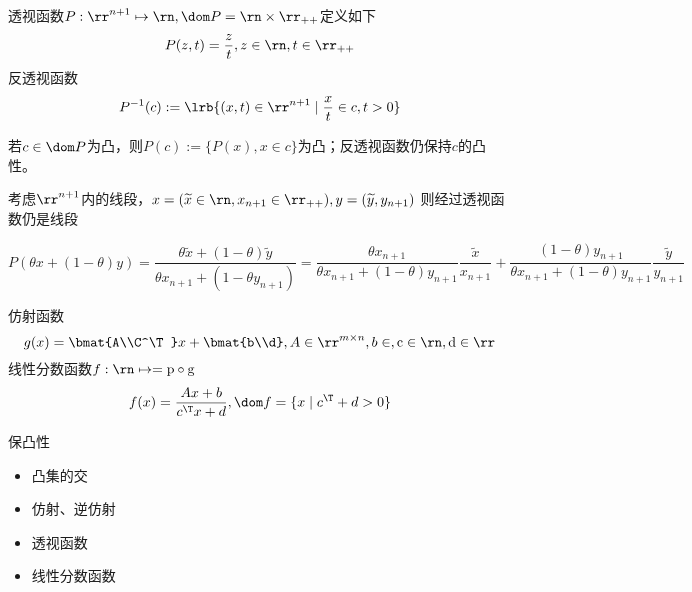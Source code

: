 \begin{definition}
透视函数$P:\rr^{n+1}\mapsto\rn,\dom P=\rn\times\rr_{++}$定义如下
\[P(z,t)=\dfrac{z}{t},z\in\rn,t\in\rr_{++}\]
反透视函数
\[P^{-1}(c):=\lrb{(x,t)\in\rr^{n+1}\mid\frac{x}{t}\in c,t>0}\]
\end{definition}

若$c\in\dom P$为凸，则$P(c):=\{P(x),x\in c\}$为凸；反透视函数仍保持$c$的凸性。

考虑$\rr^{n+1}$内的线段，$x=(\widetilde{x}\in\rn,x_{n+1}\in\rr_{++}),y=(\widetilde{y},y_{n+1})$
则经过透视函数仍是线段
\begin{analysis}
\[P(\theta x+(1-\theta)y)=\frac{\theta\widetilde{x}+(1-\theta)\widetilde{y}}{\theta x_{n+1}+(1-\theta y_{n+1})}=\frac{\theta x_{n+1}}{\theta x_{n+1}+(1-\theta)y_{n+1}}\frac{\widetilde{x}}{x_{n+1}}+\frac{(1-\theta)y_{n+1}}{\theta x_{n+1}+(1-\theta)y_{n+1}}\frac{\widetilde{y}}{y_{n+1}}\]
\end{analysis}

\begin{definition}[线性分数函数]
仿射函数
\[g(x)=\bmat{A\\C^\T}x+\bmat{b\\d},A\in\rr^{m\times n},b\in\rm,c\in\rn,d\in\rr\]
线性分数函数$f:\rn\mapsto\rm=p\circ g$
\[f(x)=\frac{Ax+b}{c^\T x+d},\dom f=\{x\mid c^\T+d>0\}\]
\end{definition}

保凸性
\begin{itemize}
	\item 凸集的交
	\item 仿射、逆仿射
	\item 透视函数
	\item 线性分数函数
\end{itemize}
